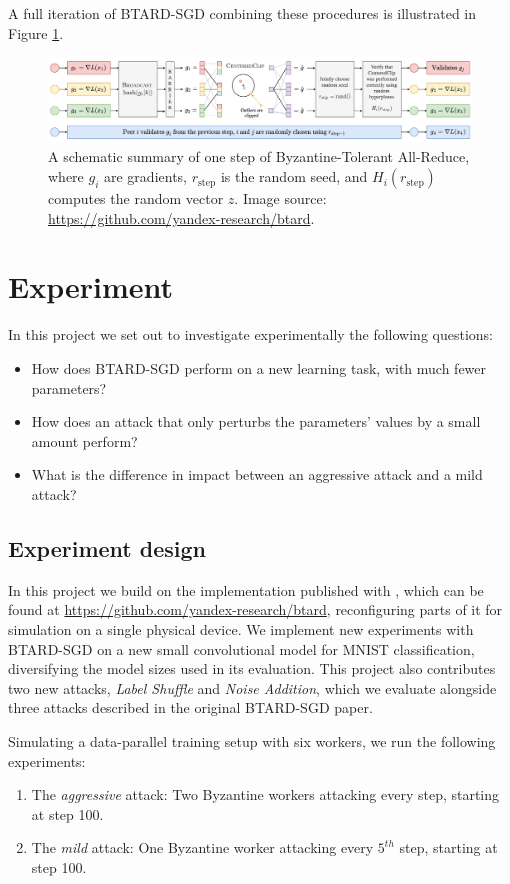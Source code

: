\documentclass{article}
\begin{document}
A full iteration of BTARD-SGD combining these procedures is illustrated in Figure \ref{fig:BTARD-scheme}.
\begin{figure}[h]
\centering
\includegraphics[width=\textwidth]{figs/btard_scheme.png}
\caption{A schematic summary of one step of Byzantine-Tolerant All-Reduce, where $g_i$ are gradients, $r_{\text{step}}$ is the random seed, and $H_i(r_{\text{step}})$ computes the random vector $z$. Image source: \url{https://github.com/yandex-research/btard}.}
\label{fig:BTARD-scheme}
\end{figure}

\section{Experiment}
\label{sec:experiment}

In this project we set out to investigate experimentally the following questions:
\begin{itemize}
    \item How does BTARD-SGD perform on a new learning task, with much fewer parameters?
    \item How does an attack that only perturbs the parameters' values by a small amount perform?
    \item What is the difference in impact between an aggressive attack and a mild attack?
\end{itemize}
\subsection{Experiment design}
\label{sec:experiment-design}
In this project we build on the implementation published with \cite{gorbunov2021secure}, which can be found at \url{https://github.com/yandex-research/btard}, reconfiguring parts of it for simulation on a single physical device. We implement new experiments with BTARD-SGD on a new small convolutional model for MNIST classification, diversifying the model sizes used in its evaluation. This project also contributes two new attacks, \textit{Label Shuffle} and \textit{Noise Addition}, which we evaluate alongside three attacks described in the original BTARD-SGD paper.

Simulating a data-parallel training setup with six workers, we run the following experiments:
\begin{enumerate}[label=\Alph*]
\item The \textit{aggressive} attack: Two Byzantine workers attacking every step, starting at step 100.
\item The \textit{mild} attack: One Byzantine worker attacking every $5^{th}$ step, starting at step 100.
\end{enumerate}
\end{document}
